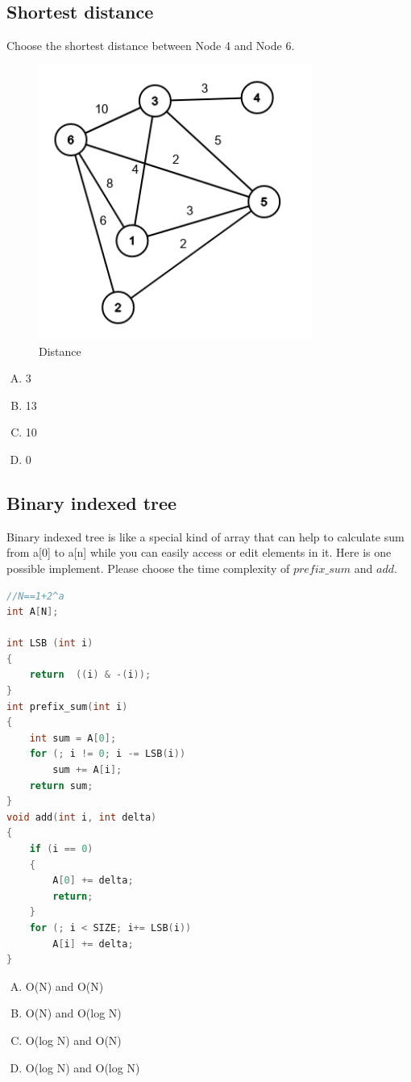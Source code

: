 \documentclass[11pt]{exam}
\begin{document}
\subsection{Shortest distance}
Choose the shortest distance between Node 4 and Node 6.
\begin{figure}[htbp]
    \centering
    \includegraphics[height=90mm,width=90mm]{distance.png}
    \caption{Distance}
\end{figure}   
\begin{enumerate}[A)]
    \item 3
    \item 13
    \item 10
    \item 0
\end{enumerate}

\begin{solution}
\end{solution}

\subsection{Binary indexed tree}
Binary indexed tree is like a special kind of array that can help to calculate sum from a[0] to a[n] while you can easily access or edit elements in it.
Here is one possible implement. Please choose the time complexity of $prefix\_sum$ and $add$.
\begin{lstlisting}[language=C++]
//N==1+2^a
int A[N];

int LSB (int i)
{
    return  ((i) & -(i));
}
int prefix_sum(int i) 
{
	int sum = A[0];
	for (; i != 0; i -= LSB(i))
		sum += A[i];
	return sum;
}
void add(int i, int delta) 
{
	if (i == 0) 
    {
		A[0] += delta;
		return;
	}
	for (; i < SIZE; i+= LSB(i))
		A[i] += delta;
}
\end{lstlisting}
\begin{enumerate}[A)]
    \item O(N) and O(N)
    \item O(N) and O(log N)
    \item O(log N) and O(N)
    \item O(log N) and O(log N)
\end{enumerate}
\end{document}
